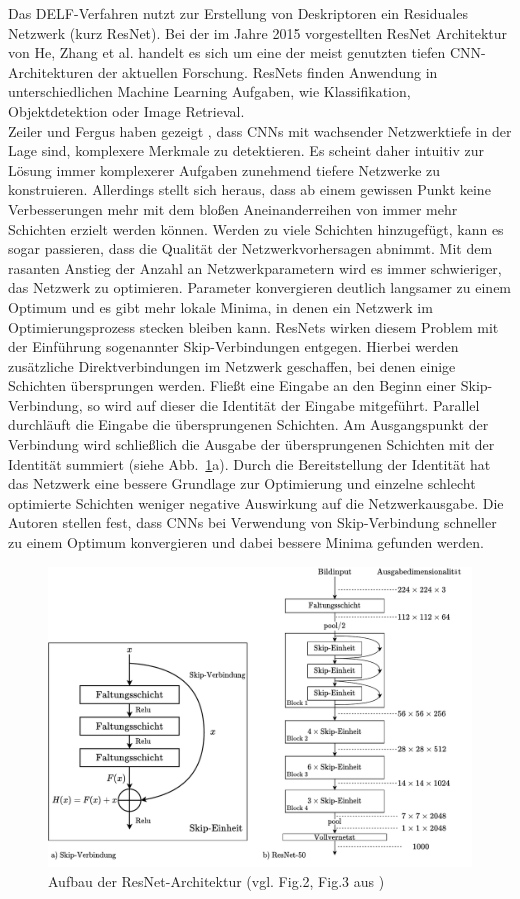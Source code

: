Das DELF-Verfahren nutzt zur Erstellung von Deskriptoren ein Residuales Netzwerk (kurz ResNet). Bei der im Jahre 2015 vorgestellten ResNet Architektur \cite{resnet} von He, Zhang et al. handelt es sich um eine der meist genutzten tiefen CNN-Architekturen der aktuellen Forschung. ResNets finden Anwendung in unterschiedlichen Machine Learning Aufgaben, wie Klassifikation, Objektdetektion oder Image Retrieval.\\
Zeiler und Fergus haben gezeigt \cite{extraction_point_meaning}, dass CNNs mit wachsender Netzwerktiefe in der Lage sind, komplexere Merkmale zu detektieren. Es scheint daher intuitiv zur Lösung immer komplexerer Aufgaben zunehmend tiefere Netzwerke zu konstruieren. Allerdings stellt sich heraus, dass ab einem gewissen Punkt keine Verbesserungen mehr mit dem bloßen Aneinanderreihen von immer mehr Schichten erzielt werden können. Werden zu viele Schichten hinzugefügt, kann es sogar passieren, dass die Qualität der Netzwerkvorhersagen abnimmt. Mit dem rasanten Anstieg der Anzahl an Netzwerkparametern wird es immer schwieriger, das Netzwerk zu optimieren. Parameter konvergieren deutlich langsamer zu einem Optimum und es gibt mehr lokale Minima, in denen ein Netzwerk im Optimierungsprozess stecken bleiben kann. ResNets wirken diesem Problem mit der Einführung sogenannter Skip-Verbindungen entgegen. Hierbei werden zusätzliche Direktverbindungen im Netzwerk geschaffen, bei denen einige Schichten übersprungen werden. Fließt eine Eingabe an den Beginn einer Skip-Verbindung, so wird auf dieser die Identität der Eingabe mitgeführt. Parallel durchläuft die Eingabe die übersprungenen Schichten. Am Ausgangspunkt der Verbindung wird schließlich die Ausgabe der übersprungenen Schichten mit der Identität summiert (siehe Abb.~\ref{resnet}a). Durch die Bereitstellung der Identität hat das Netzwerk eine bessere Grundlage zur Optimierung und einzelne schlecht optimierte Schichten weniger negative Auswirkung auf die Netzwerkausgabe. Die Autoren stellen fest, dass CNNs bei Verwendung von Skip-Verbindung schneller zu einem Optimum konvergieren und dabei bessere Minima gefunden werden. 
\\
\begin{figure}[h]
\includegraphics[scale=0.70]{resnet-50.pdf}
\caption{Aufbau der ResNet-Architektur (vgl. Fig.2, Fig.3 aus \cite{resnet})}
\label{resnet}
\end{figure}
